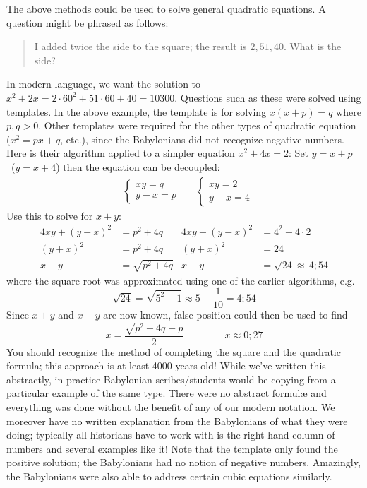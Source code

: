 The above methods could be used to solve general quadratic equations. A question might be phrased as follows:
\begin{quote}
I added twice the side to the square; the result is $2,51,40$. What is the side?
\end{quote}
In modern language, we want the solution to $x^2+2x=2\cdot 60^2+51\cdot 60+40=10300$.\smallbreak
Questions such as these were solved using templates. In the above example, the template is for solving $x(x+p)=q$ where $p,q>0$. Other templates were required for the other types of quadratic equation ($x^2=px+q$, etc.), since the Babylonians did not recognize negative numbers. Here is their algorithm applied to a simpler equation $x^2+4x=2$:\smallbreak
Set $y=x+p$ \ ($y=x+4$) then the equation can be decoupled:
\begin{align*}
&\begin{cases}
xy=q\\
y-x=p
\end{cases}
&&\begin{cases}
xy=2\\
y-x=4
\end{cases}
\end{align*}
Use this to solve for $x+y$:
\begin{align*}
4xy+(y-x)^2&=p^2+4q &4xy+(y-x)^2&=4^2+4\cdot 2\\
(y+x)^2&=p^2+4q &(y+x)^2&=24\\
x+y&=\sqrt{p^2+4q} &x+y&=\sqrt{24}\approx\,4;54
\end{align*}
where the square-root was approximated using one of the earlier algorithms, e.g.
\[\sqrt{24}=\sqrt{5^2-1}\approx 5-\frac{1}{10}=4;54\]
Since $x+y$ and $x-y$ are now known, false position could then be used to find
\[x=\frac{\sqrt{p^2+4q}-p}2 \hspace{50pt} x\approx 0;27\]
You should recognize the method of completing the square and the quadratic formula; this approach is at least 4000 years old!\smallbreak
While we've written this abstractly, in practice Babylonian scribes/students would be copying from a particular example of the same type. There were no abstract formulæ and everything was done without the benefit of any of our modern notation. We moreover have no written explanation from the Babylonians of what they were doing; typically all historians have to work with is the right-hand column of numbers and several examples like it!\smallbreak
Note that the template only found the positive solution; the Babylonians had no notion of negative numbers. Amazingly, the Babylonians were also able to address certain cubic equations similarly.

